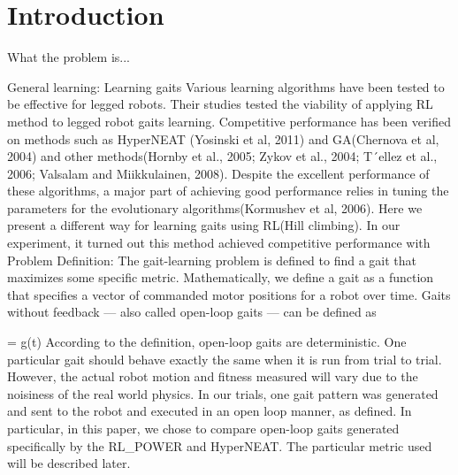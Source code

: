 \section{Introduction}

What the problem is...


General learning:
Learning gaits 
Various learning algorithms have been tested to be effective for legged robots. 
Their studies tested the viability of applying RL method to legged robot gaits learning. Competitive performance has been verified on methods such as HyperNEAT (Yosinski et al, 2011) and GA(Chernova et al, 2004) and other  methods(Hornby et al., 2005; Zykov et al., 2004; T´ellez et al., 2006; Valsalam and Miikkulainen, 2008). Despite the excellent performance of these algorithms, a major part of achieving good performance relies in tuning the parameters for the evolutionary algorithms(Kormushev et al, 2006). Here we present a different way for learning gaits using RL(Hill climbing). In our experiment, it turned out this method achieved competitive performance with 
Problem Definition:
The gait-learning problem is defined to find a gait that maximizes some specific metric. Mathematically, we define a gait as a function that specifies a vector of commanded motor positions for a robot over time. Gaits without feedback --- also called open-loop gaits --- can be defined as 

\be
{} = g(t)
\ee 
According to the definition, open-loop gaits are deterministic. One particular gait should behave exactly the same when it is run from trial to trial. However, the actual robot motion and fitness measured will vary due to the noisiness of the real world physics.
In our trials, one gait pattern was generated and sent to the robot and executed in an open loop manner, as defined. In particular, in this paper, we chose to compare open-loop gaits generated specifically by the RL_POWER and HyperNEAT. The particular metric used will be described later.
